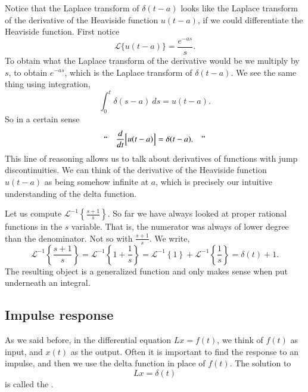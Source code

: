 \begin{remark}
Notice that the Laplace transform of $\delta(t-a)$ looks like
the Laplace transform of the derivative of the Heaviside function
$u(t-a)$, if we could differentiate the Heaviside function.
First notice
\begin{equation*}
{\mathcal{L}} \bigl\{ u(t-a) \bigr\} = \frac{e^{-as}}{s}.
\end{equation*}
To obtain what the Laplace transform of the derivative would be
we multiply by $s$, to obtain $e^{-as}$, which is the Laplace transform
of $\delta(t-a)$.
We see the same thing using integration,
\begin{equation*}
\int_0^t \delta(s-a)~ds = u(t-a) .
\end{equation*}
So in a certain sense
\begin{equation*}
\text{``} \quad \frac{d}{dt} \Bigl[ u(t-a) \Bigr] = \delta(t-a) . \quad \text{''}
\end{equation*}
This line of reasoning allows us to talk about derivatives of functions with jump
discontinuities.
We can think of
the derivative of the Heaviside function $u(t-a)$ as being somehow infinite
at $a$, which is precisely our intuitive understanding of the delta
function.
\end{remark}

\begin{example}
Let us compute ${\mathcal{L}}^{-1} \left\{ \frac{s+1}{s} \right\}$.  So
far we have always looked at proper rational functions in the $s$ variable.
That is, the numerator was always of lower degree than the denominator.
Not so with $\frac{s+1}{s}$.
We write,
\begin{equation*}
{\mathcal{L}}^{-1} \left\{ \frac{s+1}{s} \right\}
=
{\mathcal{L}}^{-1} \left\{ 1 + \frac{1}{s} \right\}
=
{\mathcal{L}}^{-1} \left\{ 1 \right\}
+
{\mathcal{L}}^{-1} \left\{ \frac{1}{s} \right\}
=
\delta(t) + 1 .
\end{equation*}
The resulting object is a generalized
function and only makes sense when put underneath an integral.
\end{example}

\subsection{Impulse response}

As we said before, in the differential equation
$L x = f(t)$,
we think of $f(t)$ as input, and $x(t)$ as the output.  Often it is important
to find the response to an impulse, and then we use
the delta function in place of $f(t)$.
The solution to
\begin{equation*}
L x = \delta(t)
\end{equation*}
is called the
\emph{}.

